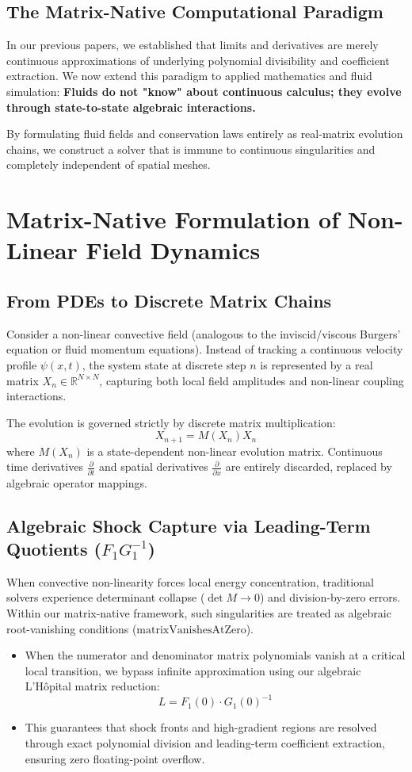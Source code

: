 \documentclass[11pt,a4paper]{article}
\begin{document}
\subsection{The Matrix-Native Computational Paradigm}
In our previous papers, we established that limits and derivatives are merely continuous approximations of underlying polynomial divisibility and coefficient extraction. We now extend this paradigm to applied mathematics and fluid simulation: \textbf{Fluids do not "know" about continuous calculus; they evolve through state-to-state algebraic interactions.} 

By formulating fluid fields and conservation laws entirely as real-matrix evolution chains, we construct a solver that is immune to continuous singularities and completely independent of spatial meshes.

\section{Matrix-Native Formulation of Non-Linear Field Dynamics}

\subsection{From PDEs to Discrete Matrix Chains}
Consider a non-linear convective field (analogous to the inviscid/viscous Burgers' equation or fluid momentum equations). Instead of tracking a continuous velocity profile $\psi(x, t)$, the system state at discrete step $n$ is represented by a real matrix $X_n \in \mathbb{R}^{N \times N}$, capturing both local field amplitudes and non-linear coupling interactions.

The evolution is governed strictly by discrete matrix multiplication:
$$X_{n+1} = M(X_n)X_n$$
where $M(X_n)$ is a state-dependent non-linear evolution matrix. Continuous time derivatives $\frac{\partial}{\partial t}$ and spatial derivatives $\frac{\partial}{\partial x}$ are entirely discarded, replaced by algebraic operator mappings.

\subsection{Algebraic Shock Capture via Leading-Term Quotients ($F_1 G_1^{-1}$)}
When convective non-linearity forces local energy concentration, traditional solvers experience determinant collapse ($\det M \to 0$) and division-by-zero errors. 
Within our matrix-native framework, such singularities are treated as algebraic root-vanishing conditions ($\text{matrixVanishesAtZero}$). 
\begin{itemize}
    \item When the numerator and denominator matrix polynomials vanish at a critical local transition, we bypass infinite approximation using our algebraic L'Hôpital matrix reduction:
    $$L = F_1(0) \cdot G_1(0)^{-1}$$
    \item This guarantees that shock fronts and high-gradient regions are resolved through exact polynomial division and leading-term coefficient extraction, ensuring zero floating-point overflow.
\end{itemize}
\end{document}
